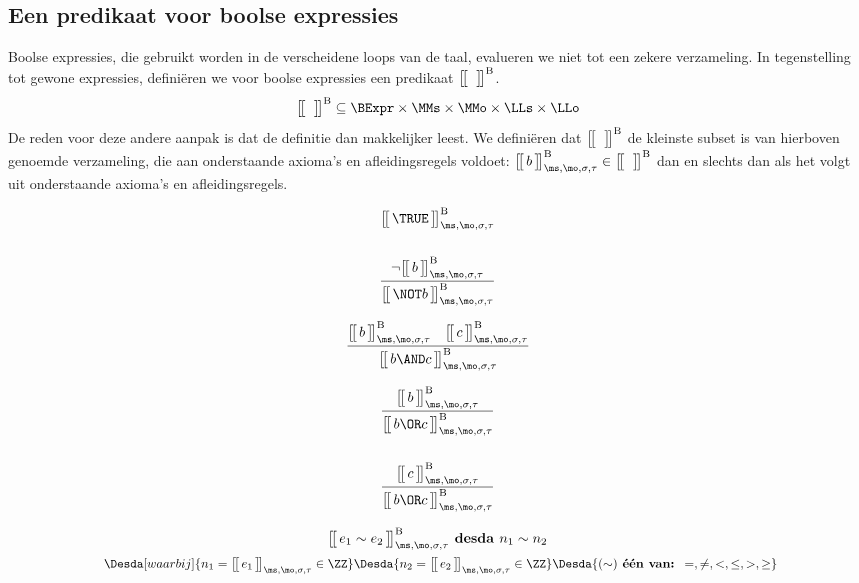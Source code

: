 \subsection{Een predikaat voor boolse expressies}

Boolse expressies, die gebruikt worden in de verscheidene loops van de taal, evalueren we niet tot een zekere verzameling. In tegenstelling tot gewone expressies, definiëren we voor boolse expressies een predikaat $\Express[B]{\;}{}$.
%
\begin{equation*}
  \Express[B]{\;}{} \subseteq \BExpr \times \MMs \times \MMo \times \LLs \times \LLo
\end{equation*}
%
De reden voor deze andere aanpak is dat de definitie dan makkelijker leest. We definiëren dat $\Express[B]{\;}{}$ de kleinste subset is van hierboven genoemde verzameling, die aan onderstaande axioma's en afleidingsregels voldoet: $\Express[B]{b}{\ms,\mo,\sigma,\tau} \in \Express[B]{\;}{}$ dan en slechts dan als het volgt uit onderstaande axioma's en afleidingsregels.

\begin{minipage}{.33\textwidth}
  \begin{gather*}
  \Express[B]{\TRUE}{\ms,\mo,\sigma,\tau} \\[15pt]
  \frac
    {\neg \Express[B]{b}{\ms,\mo,\sigma,\tau}}
    {\Express[B]{\NOT b}{\ms,\mo,\sigma,\tau}}
  \end{gather*}
\end{minipage}
\begin{minipage}{.33\textwidth}
  \begin{gather*}
  \frac
    {\Express[B]{b}{\ms,\mo,\sigma,\tau} \quad \Express[B]{c}{\ms,\mo,\sigma,\tau}}
    {\Express[B]{b \AND c}{\ms,\mo,\sigma,\tau}}
  \end{gather*}
\end{minipage}
\begin{minipage}{.33\textwidth}
  \begin{gather*}
  \frac
    {\Express[B]{b}{\ms,\mo,\sigma,\tau}}
    {\Express[B]{b \OR c}{\ms,\mo,\sigma,\tau}} \\[15pt]
  \frac
    {\Express[B]{c}{\ms,\mo,\sigma,\tau}}
    {\Express[B]{b \OR c}{\ms,\mo,\sigma,\tau}}
  \end{gather*}
\end{minipage}
\begin{gather*}
  \Express[B]{e_1 \sim e_2}{\ms,\mo,\sigma,\tau} \textbf{ desda } n_1 \sim n_2 \\
  \Desdas{
    \Desda[waarbij]{n_1 = \Express{e_1}{\ms,\mo,\sigma,\tau} \in \ZZ}
    \Desda{n_2 = \Express{e_2}{\ms,\mo,\sigma,\tau} \in \ZZ}
    \Desda{(\sim) \textbf{ één van: } =, \neq, <, \le, >, \ge}
  }
\end{gather*}

